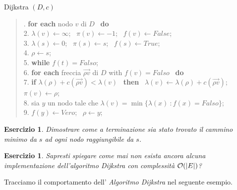 \documentclass[10pt]{article}
\def\Ord{{\cal O}}
\newtheorem{Ese}[Teo]{Esercizio}
\begin{document}
\begin{algorithm}   
\caption{{\sc Dijkstra} $(D,c)$}
\begin{quote}
.\hspace{2mm} {\bf for each} nodo $v$ di $D$ \ {\bf do}\\
2.\hspace{8mm} $\lambda(v) \leftarrow \infty$; \ $\pi(v) \leftarrow -1$; \ $f(v) \leftarrow False$;\\
3.\hspace{2mm} $\lambda(s) \leftarrow 0$; \ $\pi(s) \leftarrow s$; \ $f(s) \leftarrow True$;\\
4.\hspace{2mm} $\rho \leftarrow s$;\\
5.\hspace{2mm} {\bf while} $f(t) = Falso$;\\
6.\hspace{8mm} {\bf for each} freccia $\vec{\rho v}$ di $D$ with $f(v) = Falso$ \ {\bf do}\\
7.\hspace{16mm} {\bf if} $\lambda(\rho) + c(\vec{\rho v}) < \lambda(v)$ \ {\bf then} \ $\lambda(v) \leftarrow \lambda(\rho) + c(\vec{\rho v})$; \ $\pi(v) \leftarrow \rho$;\\
8.\hspace{8mm} sia $y$ un nodo tale che $\lambda(v) = \min\{\lambda(x) \: : f(x)= Falso\}$;\\
9.\hspace{8mm} $f(y) \leftarrow Vero$; \ $\rho \leftarrow y$; 
\end{quote}
\end{algorithm}


\begin{Ese}
   Dimostrare come a terminazione sia stato
   trovato il cammino minimo da $s$ ad ogni nodo
   raggiungibile da $s$.
\end{Ese}

\begin{Ese}
    Sapresti spiegare come mai non esista ancora
    alcuna implementazione dell'algoritmo Dijkstra
    con  complessit\`a $\Ord(|E|)$?
\end{Ese}

Tracciamo il comportamento dell' 
{\em Algoritmo Dijkstra} nel seguente esempio.
\end{document}
